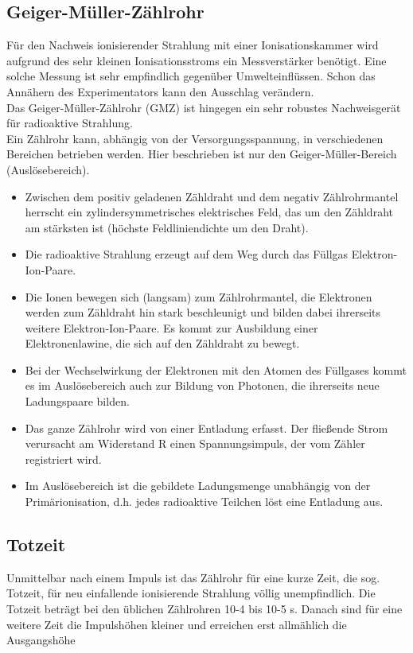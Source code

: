 \documentclass{article}
\begin{document}
	\subsection{Geiger-Müller-Zählrohr}
	Für den Nachweis ionisierender Strahlung mit einer Ionisationskammer wird aufgrund des sehr kleinen Ionisationsstroms ein Messverstärker benötigt. Eine solche Messung ist sehr empfindlich gegenüber Umwelteinflüssen. Schon das Annähern des Experimentators kann den Ausschlag verändern.\\
	Das Geiger-Müller-Zählrohr (GMZ) ist hingegen ein sehr robustes Nachweisgerät für radioaktive Strahlung. \\
	Ein Zählrohr kann, abhängig von der Versorgungsspannung, in verschiedenen Bereichen betrieben werden. Hier beschrieben ist nur den Geiger-Müller-Bereich (Auslösebereich).
	\begin{itemize}
	\item Zwischen dem positiv geladenen Zähldraht und dem negativ Zählrohrmantel herrscht ein zylindersymmetrisches elektrisches Feld, das um den Zähldraht am stärksten ist (höchste Feldliniendichte um den Draht).
	\item Die radioaktive Strahlung erzeugt auf dem Weg durch das Füllgas Elektron-Ion-Paare.
	\item Die Ionen bewegen sich (langsam) zum Zählrohrmantel, die Elektronen werden zum Zähldraht hin stark beschleunigt und bilden dabei ihrerseits weitere Elektron-Ion-Paare. Es kommt zur Ausbildung einer Elektronenlawine, die sich auf den Zähldraht zu bewegt.
	\item Bei der Wechselwirkung der Elektronen mit den Atomen des Füllgases kommt es im Auslösebereich auch zur Bildung von Photonen, die ihrerseits neue Ladungspaare bilden.
	\item Das ganze Zählrohr wird von einer Entladung erfasst. Der fließende Strom verursacht am Widerstand R einen Spannungsimpuls, der vom Zähler registriert wird.
	\item Im Auslösebereich ist die gebildete Ladungsmenge unabhängig von der Primärionisation, d.h. jedes radioaktive Teilchen löst eine Entladung aus.
	\end{itemize}
	\subsection{Totzeit}
	Unmittelbar nach einem Impuls ist das Zählrohr für eine kurze Zeit, die sog. Totzeit, für neu einfallende ionisierende Strahlung völlig unempfindlich. Die Totzeit beträgt bei den üblichen Zählrohren 10-4 bis 10-5 s. Danach sind für eine weitere Zeit die Impulshöhen kleiner und erreichen erst allmählich die Ausgangshöhe
\end{document}
